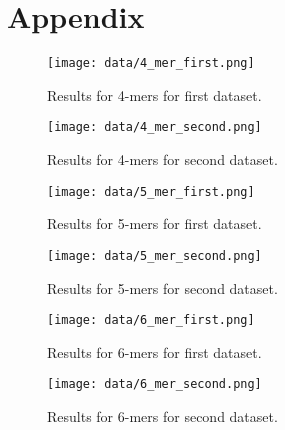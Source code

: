 \section*{Appendix}
\begin{figure}
    \centering
    \texttt{[image: data/4\_mer\_first.png]}
    \caption{Results for 4-mers for first dataset.}
\end{figure}

\begin{figure}
    \centering
    \texttt{[image: data/4\_mer\_second.png]}
    \caption{Results for 4-mers for second dataset.}
\end{figure}

\begin{figure}
    \centering
    \texttt{[image: data/5\_mer\_first.png]}
    \caption{Results for 5-mers for first dataset.}
\end{figure}

\begin{figure}
    \centering
    \texttt{[image: data/5\_mer\_second.png]}
    \caption{Results for 5-mers for second dataset.}
\end{figure}

\begin{figure}
    \centering
    \texttt{[image: data/6\_mer\_first.png]}
    \caption{Results for 6-mers for first dataset.}
\end{figure}

\begin{figure}
    \centering
    \texttt{[image: data/6\_mer\_second.png]}
    \caption{Results for 6-mers for second dataset.}
\end{figure}
